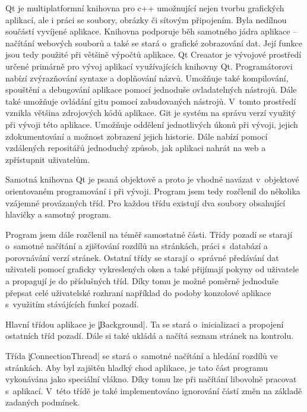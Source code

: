 
Qt je multiplatformní knihovna pro c++ umožnující nejen tvorbu grafických aplikací, ale i práci se soubory, obrázky či sítovým připojením.
Byla nedílnou součástí vyvíjené aplikace.
Knihovna podporuje běh samotného jádra aplikace -- načítání webových souborů a také se stará o~grafické zobrazování dat.
Její funkce jsou tedy použité při většině výpočtů aplikace.
Qt Creaator je vývojové prostředí určené primárně pro vývoj aplikací využívajících knihovny Qt.
Programátorovi nabízí zvýrazňování syntaxe a doplňování názvů.
Umožňuje také kompilování, spouštění a debugování aplikace pomocí jednoduše ovladatelných nástrojů.
Dále také umožňuje ovládání gitu pomocí zabudovaných nástrojů.
V~tomto prostředí vznikla většina zdrojových kódů aplikace.
Git je systém na správu verzí využitý při vývoji této aplikace.
Umožňuje oddělení jednotlivých úkonů při vývoji, jejich zdokumentování a možnost zobrazení jejich historie.
Dále nabízí pomocí vzdálených repositářů jednoduchý způsob, jak aplikaci nahrát na web a zpřístupnit uživatelům.

	Samotná knihovna Qt je psaná objektově a proto je vhodné navázat v~objektové orientovaném programování i při vývoji.
	Program jsem tedy rozčlenil do několika vzájemné provázaných tříd.
	Pro každou třídu existují dva soubory obsahující hlavičky a samotný program.

	Program jsem dále rozčlenil na téměř samostatné části.
	Třídy pozadí se starají o~samotné načítání a zjišťování rozdílů na stránkách, práci s~databází a porovnávání verzí stránek.
	Ostatní třídy se starají o~správné předávání dat uživateli pomocí graficky vykreslených oken a také přijímají pokyny od uživatele a propagují je do příslušných tříd.
	Díky tomu je možné poměrně jednoduše přepsat celé uživatelské rozhraní například do podoby konzolové aplikace s~využitím stávájících funkcí pozadí.


Hlavní třídou aplikace je \c|Background|. Ta se stará o~inicializaci a propojení ostatních tříd pozadí.
Dále si také ukládá a načítá seznam stránek na kontrolu.

Třída \c|ConnectionThread| se stará o~samotné načítání a hledání rozdílů ve stránkách. Aby byl zajištěn hladký chod aplikace, je tato část programu vykonávána jako speciální vlákno. %
Díky tomu lze při načítání libovolně pracovat s~aplikací.
V~této třídě je také implementováno ignorování částí změn na základě zadaných podmínek.


